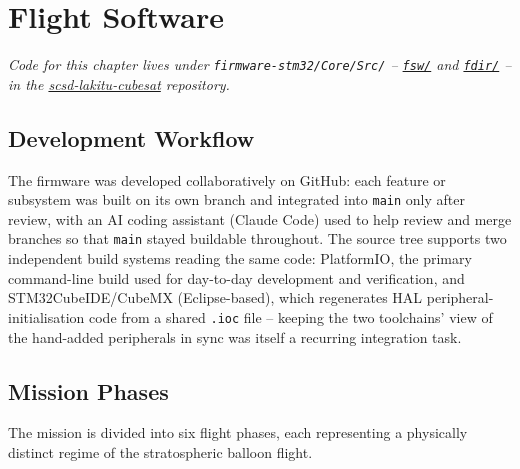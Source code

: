 \chapter{Flight Software}

\textit{Code for this chapter lives under \texttt{firmware-stm32/Core/Src/} --
\href{\repourl/tree/main/firmware-stm32/Core/Src/fsw}{\texttt{fsw/}} and
\href{\repourl/tree/main/firmware-stm32/Core/Src/fdir}{\texttt{fdir/}} -- in the
\href{\repourl}{scsd-lakitu-cubesat} repository.}

\section{Development Workflow}

The firmware was developed collaboratively on GitHub: each feature or
subsystem was built on its own branch and integrated into \texttt{main}
only after review, with an AI coding assistant (Claude Code) used to help
review and merge branches so that \texttt{main} stayed buildable
throughout. The source tree supports two independent build systems reading
the same code: PlatformIO, the primary command-line build used for
day-to-day development and verification, and STM32CubeIDE/CubeMX
(Eclipse-based), which regenerates HAL peripheral-initialisation code from
a shared \texttt{.ioc} file -- keeping the two toolchains' view of the
hand-added peripherals in sync was itself a recurring integration task.

\section{Mission Phases}

The mission is divided into six flight phases, each representing a physically distinct regime of the stratospheric balloon flight.

